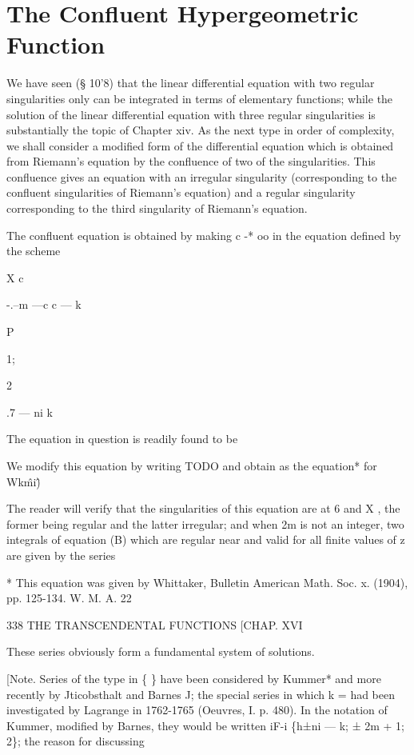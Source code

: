 \chapter{The Confluent Hypergeometric Function}


We have seen (§ 10'8) that the linear differential equation with two
regular singularities only can be integrated in terms of elementary
functions; while the solution of the linear differential equation
with three regular singularities is substantially the topic of Chapter
xiv. As the next type in order of complexity, we shall consider a
modified form of the differential equation which is obtained from
Riemann's equation by the confluence of two of the singularities. This
confluence gives an equation with an irregular singularity
(corresponding to the confluent singularities of Riemann's equation)
and a regular singularity corresponding to the third singularity of
Riemann's equation.

The confluent equation is obtained by making c -* oo in the equation
defined by the scheme

X c

-.--m —c c — k

P

1;

2

.7 — ni k

The equation in question is readily found to be

We modify this equation by writing TODO and obtain as the equation*
for Wk\^mi\^)

The reader will verify that the singularities of this equation are at
6 and X , the former being regular and the latter irregular; and when
2m is not an integer, two integrals of equation (B) which are regular
near and valid for all finite values of z are given by the series

* This equation was given by Whittaker, Bulletin American Math. Soc.
x. (1904), pp. 125-134. W. M. A. 22

338 THE TRANSCENDENTAL FUNCTIONS [CHAP. XVI

These series obviously form a fundamental system of solutions.

[Note. Series of the type in \{ \} have been considered by Kummer* and
more recently by Jticobsthalt and Barnes J; the special series in
which k = had been investigated by Lagrange in 1762-1765 (Oeuvres, I.
p. 480). In the notation of Kummer, modified by Barnes, they would be
written iF-i \{h±ni — k; ± 2m + 1; 2\}; the reason for discussing

